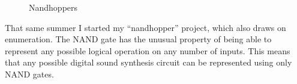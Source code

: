 \documentclass{thesis}
\begin{document}
\begin{figure}
\begin{center}
	  \caption{Nandhoppers}
	  \label{nandhoppers}
  \end{center}
\end{figure}

That same summer I started my ``nandhopper'' project\cite{kyle_mcdonald_nandhopper_2008}, which also draws on enumeration. The NAND gate has the unusual property of being able to represent any possible logical operation on any number of inputs. This means that any possible digital sound synthesis circuit can be represented using only NAND gates.
	
\end{document}
